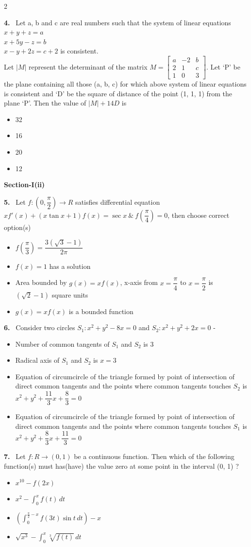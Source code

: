 \documentclass[10pt]{extarticle}
\newcommand{\sect}[1]{\par\smallskip\noindent\textbf{#1}\par}
\newcommand{\qn}[1]{\par\smallskip\noindent\textbf{#1.}~}
\newenvironment{qoptions}{\begin{itemize}[leftmargin=1.8em,itemsep=1pt,topsep=2pt,label={}]}{\end{itemize}}
\newcommand{\opt}[2]{\item[(#1)] #2}
\begin{document}
\begin{multicols}{2}
\qn{4} Let a, b and c are real numbers such that the system of linear equations\\
$x+y+z=a$\\
$x+5y-z=b$\\
$x-y+2z=c+2$ is consistent.\\
Let $|M|$ represent the determinant of the matrix $M=\begin{bmatrix}a&-2&b\\2&1&c\\1&0&3\end{bmatrix}$. Let `P' be the plane containing all those (a, b, c) for which above system of linear equations is consistent and `D' be the square of distance of the point (1, 1, 1) from the plane `P'. Then the value of $|M|+14D$ is
\begin{qoptions}
\opt{A}{32}
\opt{B}{16}
\opt{C}{20}
\opt{D}{12}
\end{qoptions}

\sect{Section-I(ii)}

\qn{5} Let $f:\left(0,\dfrac\pi2\right)\to R$ satisfies differential equation $xf'(x)+(x\tan x+1)f(x)=\sec x\ \&\ f\left(\dfrac\pi4\right)=0$, then choose correct option(s)
\begin{qoptions}
\opt{A}{$f\left(\dfrac\pi3\right)=\dfrac{3\left(\sqrt3-1\right)}{2\pi}$}
\opt{B}{$f(x)=1$ has a solution}
\opt{C}{Area bounded by $g(x)=xf(x)$, x-axis from $x=\dfrac\pi4$ to $x=\dfrac\pi2$ is $\left(\sqrt2-1\right)$ square units}
\opt{D}{$g(x)=xf(x)$ is a bounded function}
\end{qoptions}

\qn{6} Consider two circles $S_1:x^2+y^2-8x=0$ and $S_2:x^2+y^2+2x=0$ -
\begin{qoptions}
\opt{A}{Number of common tangents of $S_1$ and $S_2$ is 3}
\opt{B}{Radical axis of $S_1$ and $S_2$ is $x=3$}
\opt{C}{Equation of circumcircle of the triangle formed by point of intersection of direct common tangents and the points where common tangents touches $S_2$ is $x^2+y^2+\dfrac{11}3x+\dfrac83=0$}
\opt{D}{Equation of circumcircle of the triangle formed by point of intersection of direct common tangents and the points where common tangents touches $S_1$ is $x^2+y^2+\dfrac83x+\dfrac{11}3=0$}
\end{qoptions}

\qn{7} Let $f:R\to(0,1)$ be a continuous function. Then which of the following function(s) must has(have) the value zero at some point in the interval (0, 1) ?
\begin{qoptions}
\opt{A}{$x^{10}-f(2x)$}
\opt{B}{$x^2-\displaystyle\int_0^xf(t)\,dt$}
\opt{C}{$\left(\displaystyle\int_0^{\frac\pi2-x}f(3t)\sin t\,dt\right)-x$}
\opt{D}{$\sqrt{x^3}-\displaystyle\int_0^x\sqrt[3]{f(t)}\,dt$}
\end{qoptions}


\end{multicols}
\end{document}
